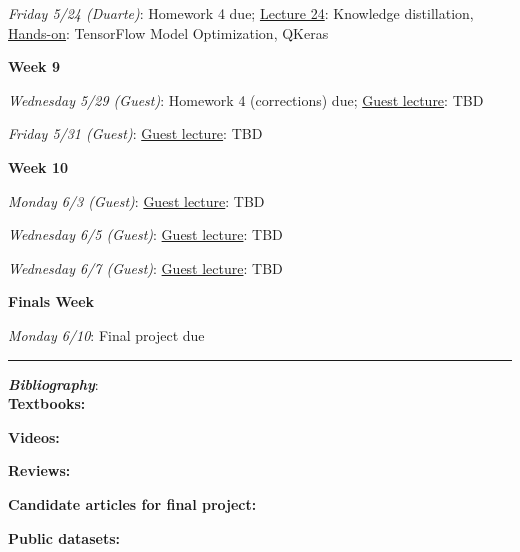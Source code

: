 \documentclass[12pt]{article}
\begin{document}
\emph{Friday 5/24 (Duarte)}: Homework 4 due; \underline{Lecture 24}: Knowledge distillation, \underline{Hands-on}: TensorFlow Model Optimization, QKeras

\noindent\textbf{Week 9}

\emph{Wednesday 5/29 (Guest)}: Homework 4 (corrections) due;  \underline{Guest lecture}: TBD

\emph{Friday 5/31 (Guest)}:  \underline{Guest lecture}: TBD

\noindent\textbf{Week 10}

\emph{Monday 6/3 (Guest)}: \underline{Guest lecture}: TBD

\emph{Wednesday 6/5 (Guest)}: \underline{Guest lecture}: TBD

\emph{Wednesday 6/7 (Guest)}: \underline{Guest lecture}: TBD

\noindent\textbf{Finals Week}

\emph{Monday 6/10}: Final project due

\begin{center}
	\rule{\textwidth}{0.5pt}
\end{center}

\noindent\textbf{\emph{Bibliography}}:\\

\textbf{Textbooks:}

\newrefsection
\nocite{Mehta:2019,Abu-Mostafa:2012,Erdman:2021,Zeljko:2014,Calafiura:2022,Chollet:2021,Goodfellow-et-al-2016}
\printbibliography[heading=none]

\textbf{Videos:}

\newrefsection
\nocite{3blue1brown_neuralnetwork,3blue1brown_gradientdescent}
\printbibliography[heading=none]

\textbf{Reviews:}

\newrefsection
\nocite{Carleo:2019ptp,hepmllivingreview}
\printbibliography[heading=none]

\textbf{Candidate articles for final project:}

\newrefsection
\nocite{deOliveira:2015xxd,Aurisano:2016jvx,Komiske:2016rsd,Khan:2018opv,Zhou:2019,Moreno:2019neq,Ormiston:2020ele,Moreno:2021fvp,Erdmann:2019nie,Guest:2016iqz}
\printbibliography[heading=none]

\textbf{Public datasets:}

\newrefsection
\nocite{kasieczka_gregor_2019_2603256,hbb_dataset,galaxy-zoo-the-galaxy-challenge,g2net-gravitational-wave-detection,trackml-particle-identification}
\printbibliography[heading=none]
\end{document}
